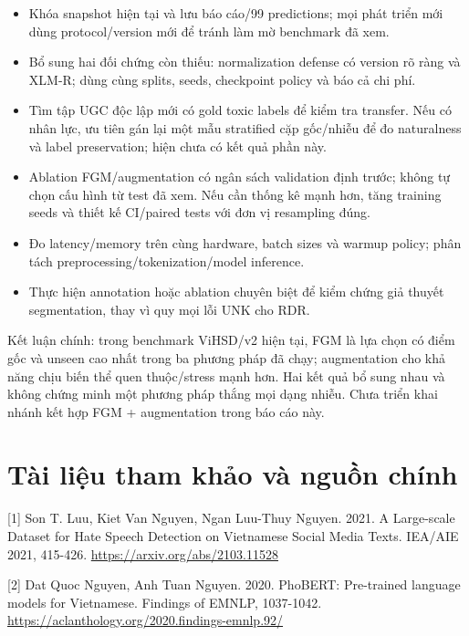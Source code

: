 \documentclass[11pt,a4paper]{article}
\begin{document}
\begin{itemize}

\item Khóa snapshot hiện tại và lưu báo cáo/99 predictions; mọi phát triển mới dùng protocol/version mới để tránh làm mờ benchmark đã xem.

\item Bổ sung hai đối chứng còn thiếu: normalization defense có version rõ ràng và XLM-R; dùng cùng splits, seeds, checkpoint policy và báo cả chi phí.

\item Tìm tập UGC độc lập mới có gold toxic labels để kiểm tra transfer. Nếu có nhân lực, ưu tiên gán lại một mẫu stratified cặp gốc/nhiễu để đo naturalness và label preservation; hiện chưa có kết quả phần này.

\item Ablation FGM/augmentation có ngân sách validation định trước; không tự chọn cấu hình từ test đã xem. Nếu cần thống kê mạnh hơn, tăng training seeds và thiết kế CI/paired tests với đơn vị resampling đúng.

\item Đo latency/memory trên cùng hardware, batch sizes và warmup policy; phân tách preprocessing/tokenization/model inference.

\item Thực hiện annotation hoặc ablation chuyên biệt để kiểm chứng giả thuyết segmentation, thay vì quy mọi lỗi UNK cho RDR.

\end{itemize}

Kết luận chính: trong benchmark ViHSD/v2 hiện tại, FGM là lựa chọn có điểm gốc và unseen cao nhất trong ba phương pháp đã chạy; augmentation cho khả năng chịu biến thể quen thuộc/stress mạnh hơn. Hai kết quả bổ sung nhau và không chứng minh một phương pháp thắng mọi dạng nhiễu. Chưa triển khai nhánh kết hợp FGM + augmentation trong báo cáo này.


\FloatBarrier\section{Tài liệu tham khảo và nguồn chính}

[1] Son T. Luu, Kiet Van Nguyen, Ngan Luu-Thuy Nguyen. 2021. A Large-scale Dataset for Hate Speech Detection on Vietnamese Social Media Texts. IEA/AIE 2021, 415-426. \url{https://arxiv.org/abs/2103.11528}


[2] Dat Quoc Nguyen, Anh Tuan Nguyen. 2020. PhoBERT: Pre-trained language models for Vietnamese. Findings of EMNLP, 1037-1042. \url{https://aclanthology.org/2020.findings-emnlp.92/}
\end{document}
